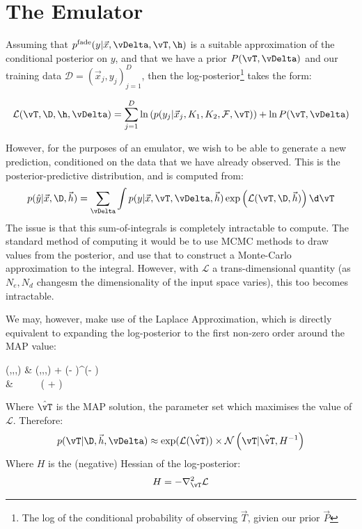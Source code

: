 \section{The Emulator}
           
    
        Assuming that $ p^\text{fade}({y}|\vec{x},\vDelta,\vT,\h)$ is a suitable approximation of the conditional posterior on $y$, and that we have a prior $P(\vT,\vDelta)$ and our training data $\mathcal{D} = (\vec{x}_j,y_j)_{j=1}^D$, then the log-posterior\footnote{The log of the conditional probability of observing $\vec{T}$, givien our prior $\vec{P}$} takes the form:

        \begin{equation}
            \mathcal{L}(\vT,\D,\h,\vDelta) = \sum_{j=1}^D \ln\left(p(y_j|\vec{x}_j,K_1,K_2,\mathcal{F},\vT)\right) + \ln P(\vT,\vDelta)
        \end{equation}

        However, for the purposes of an emulator, we wish to be able to generate a new prediction, conditioned on the data that we have already observed. This is the posterior-predictive distribution, and is computed from:
        \begin{equation}
            p(\hat{y} | \vec{x},\D,\vec{h}) = \sum_{\vDelta} \int p(y | \vec{x}, \vT,\vDelta,\vec{h}) \exp\left(\mathcal{L}(\vT,\D,\vec{h})\right)\d \vT 
        \end{equation}
        The issue is that this sum-of-integrals is completely intractable to compute. The standard method of computing it would be to use MCMC methods to draw values from the posterior, and use that to construct a Monte-Carlo approximation to the integral. However, with $\mathcal{L}$ a trans-dimensional quantity (as $N_e, N_d$ changesm the dimensionality of the input space varies), this too becomes intractable. 
        
        
        We may, however, make use of the Laplace Approximation, which is directly equivalent to expanding the log-posterior to the first non-zero order around the MAP value:
        
        \begin{spalign}
            (\vT,\D,,\vDelta) \approx  & (\hat{\vT},\D,,\vDelta) + \left(\vT - \hat{\vT}\right)^\intercal {}\left(\vT - \hat{\vT}\right) 
            \\
             & ~~~~~( + )
        \end{spalign}
        Where $\hat{\vT}$ is the MAP solution, the parameter set which maximises the value of $\mathcal{L}$. Therefore:
        \begin{equation}
            p(\vT | \D,\vec{h},\vDelta) \approx \exp(\mathcal{L}(\hat{\vT})) \times \mathcal{N}\left(\vT | \hat{\vT}, H^{-1} \right)
        \end{equation}
        Where $H$ is the (negative) Hessian of the log-posterior:
        \begin{equation}
            H = - \nabla^2_\vT \mathcal{L}
        \end{equation}

